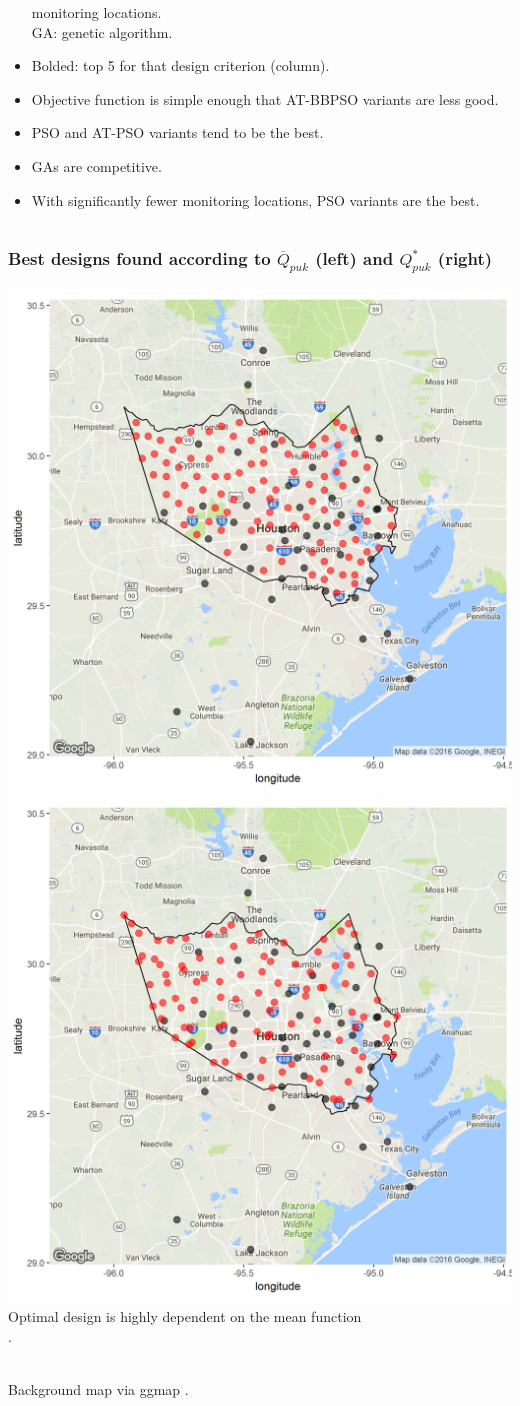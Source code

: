 \documentclass[xcolor=dvipsnames]{beamer}
\begin{document}
\begin{frame}
\begin{columns}
\begin{column}{0.55\textwidth}
\begin{itemize}
\hspace{1.42cm} monitoring locations.\\
GA: genetic algorithm.
\item Bolded: top 5 for that design criterion (column).\pause
\item Objective function is simple enough that AT-BBPSO variants are less good.\pause
\item PSO and AT-PSO variants tend to be the best. \pause
\item GAs are competitive. \pause
\item With significantly fewer monitoring locations, PSO variants are the best.
  \end{itemize}
\end{column}
\end{columns}
\end{frame}

\begin{frame}
\frametitle{Best designs found according to $\overline{Q}_{puk}$ (left) and $Q^*_{puk}$ (right)}
{\centering
\includegraphics[width=.49\textwidth]{../doc/sig2pukmean.png}
\includegraphics[width=.49\textwidth]{../doc/sig2pukmax.png}
}\\
Optimal design is highly dependent on the mean function\\ \citep{zimmerman2006optimal}.\\~

Background map via ggmap \citep{ggmap2013}.

\end{frame}
\end{document}
